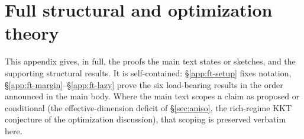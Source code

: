 %

\providecommand{\Z}{\mathbb{Z}}
\providecommand{\E}{\mathbb{E}}
\providecommand{\Vac}{V_{\mathrm{ac}}}
\providecommand{\Sep}{\mathrm{Sep}}
\providecommand{\one}{\mathbf 1}
\providecommand{\Piinv}{\Pi_{\mathrm{inv}}}
\providecommand{\sign}{\mathrm{sign}}
\providecommand{\conv}{\operatorname{conv}}
\providecommand{\dist}{\operatorname{dist}}
\providecommand{\Lip}{\operatorname{Lip}}
\providecommand{\Orb}{\mathcal O}

\section{Full structural and optimization theory}\label{app:theory}
This appendix gives, in full, the proofs the main text states or sketches, and
the supporting structural results. It is self-contained: \S\ref{app:ft-setup}
fixes notation, \S\ref{app:ft-margin}--\S\ref{app:ft-lazy} prove the six
load-bearing results in the order announced in the main body. Where the main
text scopes a claim as proposed or conditional (the effective-dimension deficit
of \S\ref{sec:aniso}, the rich-regime KKT conjecture of the optimization
discussion), that scoping is preserved verbatim here.

